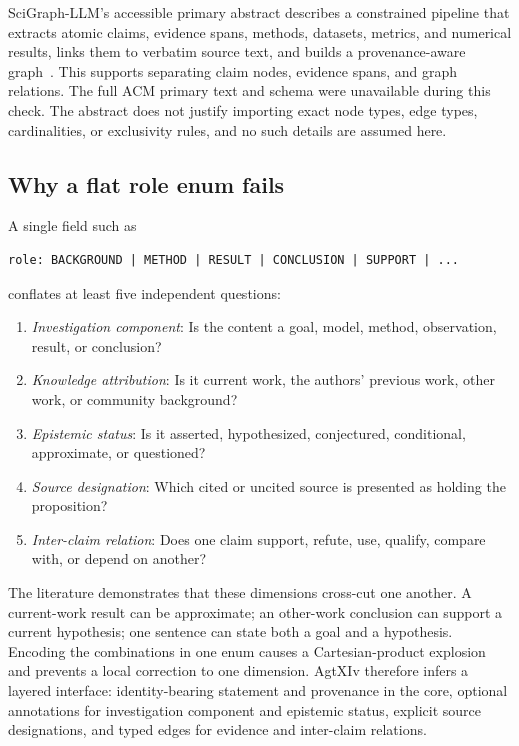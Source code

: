 SciGraph-LLM's accessible primary abstract describes a constrained pipeline that extracts atomic claims, evidence spans, methods, datasets, metrics, and numerical results, links them to verbatim source text, and builds a provenance-aware graph~\cite{malashin2026scigraphllm}. This supports separating claim nodes, evidence spans, and graph relations. The full ACM primary text and schema were unavailable during this check. The abstract does not justify importing exact node types, edge types, cardinalities, or exclusivity rules, and no such details are assumed here.

\subsection{Why a flat role enum fails}

A single field such as
\begin{lstlisting}[style=interface]
role: BACKGROUND | METHOD | RESULT | CONCLUSION | SUPPORT | ...
\end{lstlisting}
conflates at least five independent questions:
\begin{enumerate}
  \item \emph{Investigation component}: Is the content a goal, model, method, observation, result, or conclusion?
  \item \emph{Knowledge attribution}: Is it current work, the authors' previous work, other work, or community background?
  \item \emph{Epistemic status}: Is it asserted, hypothesized, conjectured, conditional, approximate, or questioned?
  \item \emph{Source designation}: Which cited or uncited source is presented as holding the proposition?
  \item \emph{Inter-claim relation}: Does one claim support, refute, use, qualify, compare with, or depend on another?
\end{enumerate}
The literature demonstrates that these dimensions cross-cut one another. A current-work result can be approximate; an other-work conclusion can support a current hypothesis; one sentence can state both a goal and a hypothesis. Encoding the combinations in one enum causes a Cartesian-product explosion and prevents a local correction to one dimension. AgtXIv therefore infers a layered interface: identity-bearing statement and provenance in the core, optional annotations for investigation component and epistemic status, explicit source designations, and typed edges for evidence and inter-claim relations.